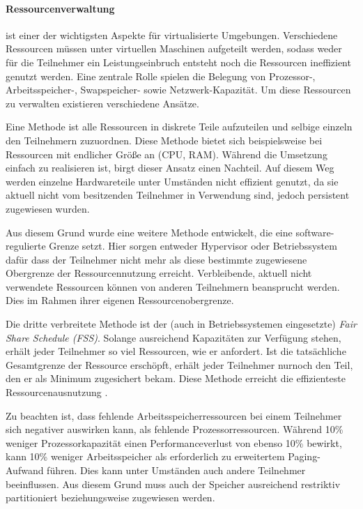 \paragraph{Ressourcenverwaltung} ist einer der wichtigsten Aspekte für virtualisierte Umgebungen.
Verschiedene Ressourcen müssen unter virtuellen Maschinen aufgeteilt werden, sodass weder für die
Teilnehmer ein Leistungseinbruch entsteht noch die Ressourcen ineffizient genutzt werden.
Eine zentrale Rolle spielen die Belegung von Prozessor-, Arbeitsspeicher-,
Swapspeicher- sowie Netzwerk-Kapazität. Um diese Ressourcen zu verwalten existieren verschiedene
Ansätze.

Eine Methode ist alle Ressourcen in diskrete Teile aufzuteilen und selbige einzeln den Teilnehmern
zuzuordnen. Diese Methode bietet sich beispielsweise bei Ressourcen mit endlicher Größe an
(CPU, RAM). Während die Umsetzung einfach zu realisieren ist, birgt dieser Ansatz einen Nachteil.
Auf diesem Weg werden einzelne Hardwareteile unter Umständen nicht effizient genutzt,
da sie aktuell nicht vom besitzenden Teilnehmer in Verwendung sind, jedoch persistent zugewiesen wurden.

Aus diesem Grund wurde eine weitere Methode entwickelt, die eine software-regulierte Grenze setzt.
Hier sorgen entweder Hypervisor oder Betriebssystem dafür dass der Teilnehmer nicht mehr als
diese bestimmte zugewiesene Obergrenze der Ressourcennutzung erreicht. Verbleibende, aktuell
nicht verwendete Ressourcen können von anderen Teilnehmern beansprucht werden. Dies im Rahmen
ihrer eigenen Ressourcenobergrenze\cite{victor10}.

Die dritte verbreitete Methode ist der (auch in Betriebssystemen eingesetzte)
\textit{Fair Share Schedule (FSS)}. Solange ausreichend Kapazitäten zur Verfügung stehen,
erhält jeder Teilnehmer so viel Ressourcen, wie er anfordert. Ist die tatsächliche Gesamtgrenze der
Ressource erschöpft, erhält jeder Teilnehmer nurnoch den Teil, den er als Minimum zugesichert bekam.
Diese Methode erreicht die effizienteste Ressourcenausnutzung \cite{victor10}.

Zu beachten ist, dass fehlende Arbeitsspeicherressourcen bei einem Teilnehmer sich negativer auswirken
kann, als fehlende Prozessorressourcen. Während 10\% weniger Prozessorkapazität einen
Performanceverlust von ebenso 10\% bewirkt, kann 10\% weniger Arbeitsspeicher als erforderlich zu
erweitertem Paging-Aufwand führen. Dies kann unter Umständen auch andere Teilnehmer beeinflussen.
Aus diesem Grund muss auch der Speicher ausreichend restriktiv partitioniert beziehungsweise zugewiesen werden.

